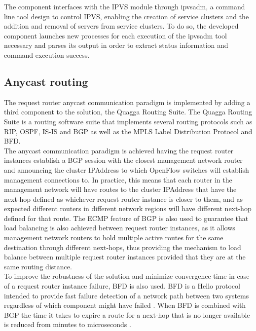 %
The component interfaces with the \gls{IPVS} module through ipvsadm, a command line tool design to control \gls{IPVS}, enabling the creation of service clusters and the addition and removal of servers from service clusters.
To do so, the developed component launches new processes for each execution of the ipvsadm tool necessary and parses its output in order to extract status information and command execution success.
%
\subsection{Anycast routing}
\label{subsection:anycast-implementation}
The request router anycast communication paradigm is implemented by adding a third component to the solution, the Quagga Routing Suite.
The Quagga Routing Suite is a routing software suite that implements several routing protocols such as \gls{RIP}, \gls{OSPF}, \gls{IS-IS} and \gls{BGP} as well as the \gls{MPLS} Label Distribution Protocol and \gls{BFD}.\\
%
The anycast communication paradigm is achieved having the request router instances establish a \gls{BGP} session with the closest management network router and announcing the cluster \gls{IPAddress} to which OpenFlow switches will establish management connections to.
In practice, this means that each router in the management network will have routes to the cluster \gls{IPAddress} that have the next-hop defined as whichever request router instance is closer to them, and as expected different routers in different network regions will have different next-hop defined for that route.
The \gls{ECMP} feature of \gls{BGP} is also used to guarantee that load balancing is also achieved between request router instances, as it allows management network routers to hold multiple active routes for the same destination through different next-hops, thus providing the mechanism to load balance between multiple request router instances provided that they are at the same routing distance.\\
%
To improve the robustness of the solution and minimize convergence time in case of a request router instance failure, \gls{BFD} is also used.
\gls{BFD} is a Hello protocol intended to provide fast failure detection of a network path between two systems regardless of which component might have failed \cite{rfc5880}.
When \gls{BFD} is combined with \gls{BGP} the time it takes to expire a route for a next-hop that is no longer available is reduced from minutes to microseconds \cite{rfc5880}\cite{rfc4271}.
